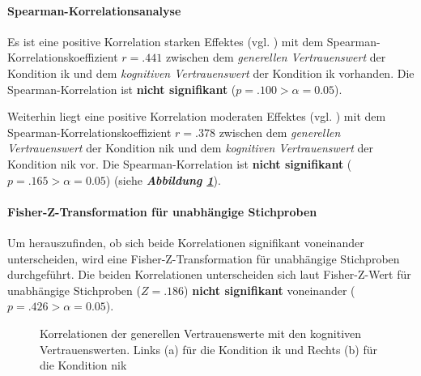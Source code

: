 \documentclass[a4paper,11pt]{article}%
\renewcommand{\\}{\vspace*{0.5\baselineskip} \newline}
\begin{document}
\paragraph{Spearman-Korrelationsanalyse}
Es ist eine positive Korrelation starken Effektes (vgl. \citep{cohen2013statistical}) mit dem Spearman-Korrelationskoeffizient $r = .441$ zwischen dem \textit{generellen Vertrauenswert} der Kondition \ac{ik} und dem \textit{kognitiven Vertrauenswert} der Kondition \ac{ik} vorhanden. Die Spearman-Korrelation ist \textbf{nicht signifikant} ($p = .100 > \alpha = 0.05$).

Weiterhin liegt eine positive Korrelation moderaten Effektes (vgl. \citep{cohen2013statistical}) mit dem Spearman-Korrelationskoeffizient $r = .378$ zwischen dem \textit{generellen Vertrauenswert} der Kondition \ac{nik} und dem \textit{kognitiven Vertrauenswert} der Kondition \ac{nik} vor. Die Spearman-Korrelation ist \textbf{nicht signifikant} ($p = .165 > \alpha = 0.05$) (siehe \textbf{\textit{Abbildung \ref{H2_Korrelation_Auswertung}}}).

\paragraph{Fisher-Z-Transformation für unabhängige Stichproben}
Um herauszufinden, ob sich beide Korrelationen signifikant voneinander unterscheiden, wird eine Fisher-Z-Transformation für unabhängige Stichproben durchgeführt.
Die beiden Korrelationen unterscheiden sich laut Fisher-Z-Wert für unabhängige Stichproben ($Z= .186$) \textbf{nicht signifikant} voneinander ($p = .426 > \alpha = 0.05$).

\begin{figure}[h]
  \centering
  \qquad
  \caption[Korrelationen der generellen Vertrauenswerte mit den kognitiven Vertrauenswerten]{Korrelationen der generellen Vertrauenswerte mit den kognitiven Vertrauenswerten. Links (a) für die Kondition \ac{ik} und Rechts (b) für die Kondition \ac{nik}}
  \label{H2_Korrelation_Auswertung}
\end{figure}
\end{document}
